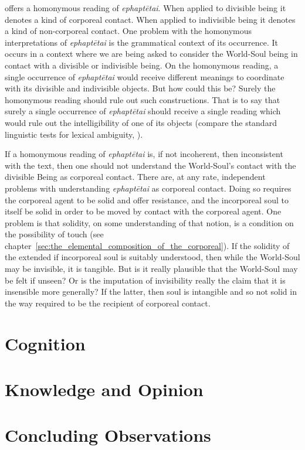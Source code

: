 \citet{Betegh:2019fq} offers a homonymous reading of \emph{ephaptētai}. When applied to divisible being it denotes a kind of corporeal contact. When applied to indivisible being it denotes a kind of non-corporeal contact. One problem with the homonymous interpretations of \emph{ephaptētai} is the grammatical context of its occurrence. It occurs in a context where we are being asked to consider the World-Soul being in contact with a divisible or indivisible being. On the homonymous reading, a single occurrence of \emph{ephaptētai} would receive different meanings to coordinate with its divisible and indivisible objects. But how could this be? Surely the homonymous reading should rule out such constructions. That is to say that surely a single occurrence of \emph{ephaptētai} should receive a single reading which would rule out the intelligibility of one of its objects (compare the standard linguistic tests for lexical ambiguity, \citealt{Zwicky:1975hl}).

If a homonymous reading of \emph{ephaptētai} is, if not incoherent, then inconsistent with the text, then one should not understand the World-Soul's contact with the divisible Being as corporeal contact. There are, at any rate, independent problems with understanding \emph{ephaptētai} as corporeal contact. Doing so requires the corporeal agent to be solid and offer resistance, and the incorporeal soul to itself be solid in order to be moved by contact with the corporeal agent. One problem is that solidity, on some understanding of that notion, is a condition on the possibility of touch (see chapter~\ref{sec:the_elemental_composition_of_the_corporeal}). If the solidity of the extended if incorporeal soul is suitably understood, then while the World-Soul may be invisible, it is tangible. But is it really plausible that the World-Soul may be felt if unseen? Or is the imputation of invisibility really the claim that it is insensible more generally? If the latter, then soul is intangible and so not solid in the way required to be the recipient of corporeal contact.


\section{Cognition} %
\label{sec:cognition}




\section{Knowledge and Opinion} %
\label{sec:knowledge_and_opinion}




\section{Concluding Observations} %
\label{sec:concluding_observations_cr}




